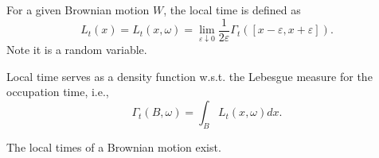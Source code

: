 \begin{defn}
    For a given Brownian motion $W$, the local time is defined as
    \begin{equation*}
        L_t(x) = L_t(x,\omega) = \lim_{\varepsilon \downarrow 0} \frac{1}{2\varepsilon}\Gamma_t([x-\varepsilon,x+\varepsilon]).
    \end{equation*}
    Note it is a random variable.
\end{defn}
\begin{rmk}
    Local time serves as a density function  w.s.t. the Lebesgue measure for the occupation time, i.e.,
    \begin{equation*}
        \Gamma_t(B,\omega) = \int_B L_t(x,\omega)dx.
    \end{equation*}
\end{rmk}

\begin{thm}
    The local times of a Brownian motion exist.
\end{thm}

